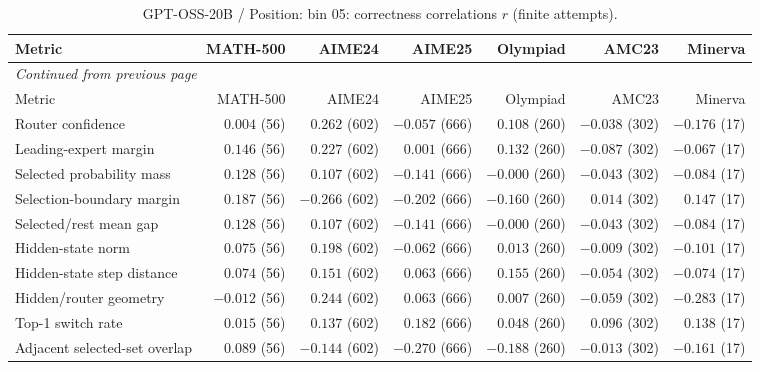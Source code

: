 \begingroup\scriptsize\setlength{\tabcolsep}{4pt}
\begin{longtable}{@{}lrrrrrr@{}}
\caption{GPT-OSS-20B / Position: bin 05: correctness correlations $r$ (finite attempts).}\label{tab:multi-gptoss-position-bin_05}\\
\toprule
Metric & MATH-500 & AIME24 & AIME25 & Olympiad & AMC23 & Minerva \\
\midrule\endfirsthead
\multicolumn{7}{l}{\textit{Continued from previous page}}\\
\toprule
Metric & MATH-500 & AIME24 & AIME25 & Olympiad & AMC23 & Minerva \\
\midrule\endhead
\bottomrule\endfoot
Router confidence & $0.004$ (56) & $0.262$ (602) & $-0.057$ (666) & $0.108$ (260) & $-0.038$ (302) & $-0.176$ (17) \\
Leading-expert margin & $0.146$ (56) & $0.227$ (602) & $0.001$ (666) & $0.132$ (260) & $-0.087$ (302) & $-0.067$ (17) \\
Selected probability mass & $0.128$ (56) & $0.107$ (602) & $-0.141$ (666) & $-0.000$ (260) & $-0.043$ (302) & $-0.084$ (17) \\
Selection-boundary margin & $0.187$ (56) & $-0.266$ (602) & $-0.202$ (666) & $-0.160$ (260) & $0.014$ (302) & $0.147$ (17) \\
Selected/rest mean gap & $0.128$ (56) & $0.107$ (602) & $-0.141$ (666) & $-0.000$ (260) & $-0.043$ (302) & $-0.084$ (17) \\
Hidden-state norm & $0.075$ (56) & $0.198$ (602) & $-0.062$ (666) & $0.013$ (260) & $-0.009$ (302) & $-0.101$ (17) \\
Hidden-state step distance & $0.074$ (56) & $0.151$ (602) & $0.063$ (666) & $0.155$ (260) & $-0.054$ (302) & $-0.074$ (17) \\
Hidden/router geometry & $-0.012$ (56) & $0.244$ (602) & $0.063$ (666) & $0.007$ (260) & $-0.059$ (302) & $-0.283$ (17) \\
Top-1 switch rate & $0.015$ (56) & $0.137$ (602) & $0.182$ (666) & $0.048$ (260) & $0.096$ (302) & $0.138$ (17) \\
Adjacent selected-set overlap & $0.089$ (56) & $-0.144$ (602) & $-0.270$ (666) & $-0.188$ (260) & $-0.013$ (302) & $-0.161$ (17) \\
\end{longtable}\endgroup

